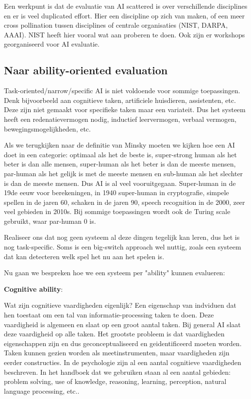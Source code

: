 \documentclass[11pt]{article}
\begin{document}
Een werkpunt is dat de evaluatie van AI scattered is over verschillende disciplines en er is veel duplicated effort. Hier een discipline op zich van maken, of een meer cross pollination tussen disciplines of centrale organisaties (NIST, DARPA, AAAI). NIST heeft hier vooral wat aan proberen te doen. Ook zijn er workshops georganiseerd voor AI evaluatie.

\subsection{Naar ability-oriented evaluation}
\label{sec:org24c6181}

Task-oriented/narrow/specific AI is niet voldoende voor sommige toepassingen. Denk bijvoorbeeld aan cognitieve taken, artificiele huisdieren, assistenten, etc. Deze zijn niet gemaakt voor specifieke taken maar een variateit. Dus het systeem heeft een redenatievermogen nodig, inductief leervermogen, verbaal vermogen, bewegingsmogelijkheden, etc.

Als we terugkijken naar de definitie van Minsky moeten we kijken hoe een AI doet in een categorie: optimaal als het de beste is, super-strong human als het beter is dan alle mensen, super-human als het beter is dan de meeste mensen, par-human als het gelijk is met de meeste mensen en sub-human als het slechter is dan de meeste mensen. Dus AI is al veel vooruitgegaan. Super-human in de 19de eeuw voor berekeningen, in 1940 super-human in cryptografie, simpele spellen in de jaren 60, schaken in de jaren 90, speech recognition in de 2000, zeer veel gebieden in 2010s. Bij sommige toepassingen wordt ook de Turing scale gebruikt, waar par-human 0 is.

Realiseer ons dat nog geen systeem al deze dingen tegelijk kan leren, dus het is nog task-specific. Soms is een big-switch approach wel nuttig, zoals een systeem dat kan detecteren welk spel het nu aan het spelen is.

Nu gaan we bespreken hoe we een systeem per "ability" kunnen evalueren:

\textbf{Cognitive ability}:

Wat zijn cognitieve vaardigheden eigenlijk? Een eigenschap van indviduen dat hen toestaat om een tal van informatie-processing taken te doen. Deze vaardigheid is algemeen en slaat op een groot aantal taken. Bij general AI slaat deze vaardigheid op alle taken. Het grootste probleem is dat vaardigheden eigenschappen zijn en dus geconceptualiseerd en geidentificeerd moeten worden. Taken kunnen gezien worden als meetinstrumenten, maar vaardigheden zijn eerder constructies. In de psychologie zijn al een aantal cognitieve vaardigheden beschreven. In het handboek dat we gebruiken staan al een aantal gebieden: problem solving, use of knowledge, reasoning, learning, perception, natural language processing, etc..
\end{document}
